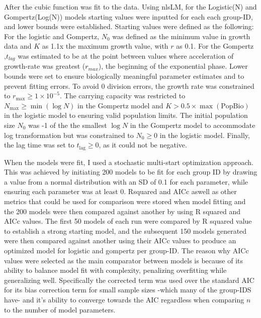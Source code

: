 \documentclass[11pt]{article}
\begin{document}
After the cubic function was fit to the data. Using nlsLM, for the Logistic(N) and Gompertz(Log(N)) models starting values were inputted for each each group-ID, and lower bounds were established. Starting values were defined as the following: For the logistic and Gompertz, $N_0$ was defined as the minimum value in growth data and $K$ as 1.1x the maximum growth value, with $r$ as 0.1. For the Gompertz ,$t_{lag}$ was estimated to be at the point between values where acceleration of growth-rate was greatest ($r_{max}$), the beginning of the exponential phase. Lower bounds were set to ensure biologically meaningful parameter estimates and to prevent fitting errors.  
To avoid 0 division errors, the growth rate was constrained to \( r_{\text{max}} \geq 1 \times 10^{-5} \).  
The carrying capacity was restricted to \( N_{\max} \geq \min(\log N) \) in the Gompertz model and \( K > 0.5 \times \max(\text{PopBio}) \) in the logistic model to ensuring valid population limits.  
The initial population size \( N_0 \) was -1 of the the smallest \(\log N\) in the Gompertz model to accommodate log transformation but was constrained to \( N_0 \geq 0 \) in the logistic model.  
Finally, the lag time was set to \( t_{\text{lag}} \geq 0 \), as it could not be negative.  

          
\setlength{\parskip}{1.2em} %

When the models were fit, I used a stochastic multi-start optimization approach. This was achieved by initiating 200 models to be fit for each group ID by drawing a value from a normal distribution with an SD of 0.1 for each parameter, while ensuring each parameter was at least 0. Rsquared and AICc aswell as other metrics that could be used for comparison were stored when model fitting and the 200 models were then compared against another by using R squared and AICc values. The first 50 models of each run were compared by R squared value to establish a strong starting model, and the subsequent 150 models generated were then compared against another using their AICc values to produce an optimized model for logistic and gompertz per group-ID. The reason why AICc values were selected as the main comparator between models is because of its ability to balance model fit with complexity, penalizing overfitting while generalizing well. Specifically the corrected term was used over the standard AIC for its bias correction term for small sample sizes -which many of the group-IDS have- and it's ability to converge towards the AIC regardless when comparing $n$ to the number of model parameters\cite{anderson2004model, johnson2004model}. 
\setlength{\parskip}{1.2em} %
\end{document}
